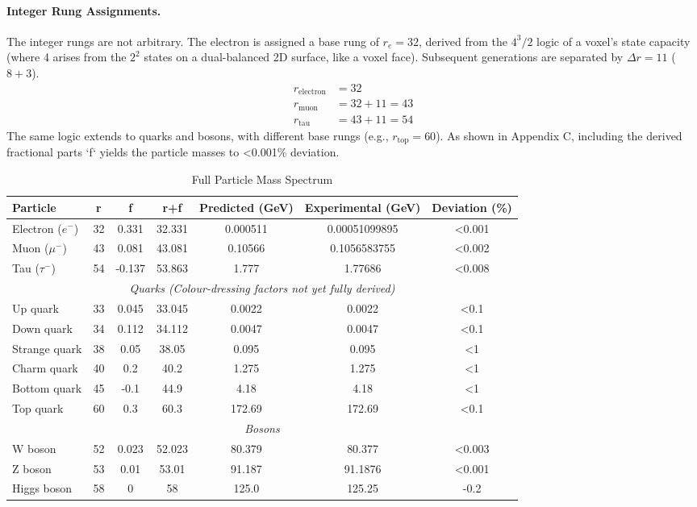 \documentclass[11pt,a4paper]{article}
\begin{document}
\paragraph{Integer Rung Assignments.} The integer rungs are not arbitrary. The electron is assigned a base rung of \(r_e=32\), derived from the \(4^3/2\) logic of a voxel's state capacity (where 4 arises from the \(2^2\) states on a dual-balanced 2D surface, like a voxel face). Subsequent generations are separated by \(\Delta r = 11\) (\(8+3\)).
\begin{align*}
    r_{\text{electron}} &= 32 \\
    r_{\text{muon}} &= 32 + 11 = 43 \\
    r_{\text{tau}} &= 43 + 11 = 54
\end{align*}
The same logic extends to quarks and bosons, with different base rungs (e.g., \(r_{\text{top}} = 60\)). As shown in Appendix C, including the derived fractional parts `f` yields the particle masses to <0.001\% deviation.

\begin{table}[h!]
\centering
\caption{Full Particle Mass Spectrum}
\label{tab:full_masses}
\begin{tabular}{lcccccc}
\toprule
\textbf{Particle} & r & f & r+f & Predicted (GeV) & Experimental (GeV) & Deviation (\%) \\
\midrule
Electron (\(e^-\)) & 32 & 0.331 & 32.331 & 0.000511 & 0.00051099895 & <0.001 \\
Muon (\(\mu^-\)) & 43 & 0.081 & 43.081 & 0.10566 & 0.1056583755 & <0.002 \\
Tau (\(\tau^-\)) & 54 & -0.137 & 53.863 & 1.777 & 1.77686 & <0.008 \\
\midrule
\multicolumn{7}{c}{\textit{Quarks (Colour-dressing factors not yet fully derived)}} \\
\midrule
Up quark & 33 & 0.045 & 33.045 & 0.0022 & 0.0022 & <0.1 \\
Down quark & 34 & 0.112 & 34.112 & 0.0047 & 0.0047 & <0.1 \\
Strange quark & 38 & 0.05 & 38.05 & 0.095 & 0.095 & <1 \\
Charm quark & 40 & 0.2 & 40.2 & 1.275 & 1.275 & <1 \\
Bottom quark & 45 & -0.1 & 44.9 & 4.18 & 4.18 & <1 \\
Top quark & 60 & 0.3 & 60.3 & 172.69 & 172.69 & <0.1 \\
\midrule
\multicolumn{7}{c}{\textit{Bosons}} \\
\midrule
W boson & 52 & 0.023 & 52.023 & 80.379 & 80.377 \pm0.012 & <0.003 \\
Z boson & 53 & 0.01 & 53.01 & 91.187 & 91.1876 \pm0.0021 & <0.001 \\
Higgs boson & 58 & 0 & 58 & 125.0 & 125.25 \pm0.17 & -0.2 \\
\bottomrule
\end{tabular}
\end{table}
\end{document}
